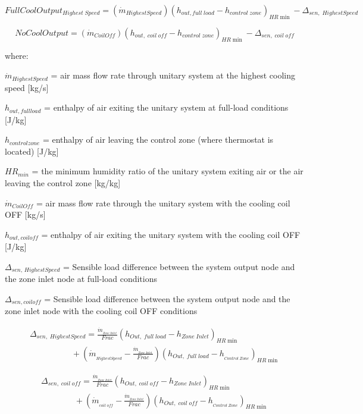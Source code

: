 \begin{equation}
  FullCoolOutpu{t_{Highest\;Speed}} = ({\dot m_{HighestSpeed}}){({h_{out,full\;load}} - {h_{control\;zone}})_{HR\min }} - {\Delta_{sen,\;HighestSpeed}}
\end{equation}

\begin{equation}
  NoCoolOutput = ({\dot m_{CoilOff}}){({h_{out,\;coil\;off}} - {h_{control\;zone}})_{HR\min }} - {\Delta_{sen,\;coil\;off}}
\end{equation}

where:

\({\dot m_{HighestSpeed}}\) = air mass flow rate through unitary system at the highest cooling speed {[}kg/s{]}

\(h_{out,full load}\) = enthalpy of air exiting the unitary system at full-load conditions {[}J/kg{]}

\(h_{control zone}\) = enthalpy of air leaving the control zone (where thermostat is located) {[}J/kg{]}

\(HR_{min}\) = the minimum humidity ratio of the unitary system exiting air or the air leaving the control zone {[}kg/kg{]}

\({\dot m_{CoilOff}}\) = air mass flow rate through the unitary system with the cooling coil OFF {[}kg/s{]}

\(h_{out,coil off}\) = enthalpy of air exiting the unitary system with the cooling coil OFF {[}J/kg{]}

\(\Delta_{sen,\,HighestSpeed}\) = Sensible load difference between the system output node and the zone inlet node at full-load conditions

\(\Delta_{sen,coil off}\) = Sensible load difference between the system output node and the zone inlet node with the cooling coil OFF conditions

\begin{equation}
\begin{array}{l}
{\Delta_{sen,\;HighestSpeed}} = \frac{{{{\dot m}_{_{Zone\;Inlet}}}}}{{Frac}}{\left( {{h_{Out,\;full\;load}} - {h_{Zone\;Inlet}}} \right)_{HR\min }}\\\quad \quad \quad \quad \quad  + \left( {{{\dot m}_{_{HighestSpeed}}} - \frac{{{{\dot m}_{_{Zone\;Inlet}}}}}{{Frac}}} \right){\left( {{h_{Out,\;full\;load}} - {h_{_{Control\;Zone}}}} \right)_{HR\min }}
\end{array}
\end{equation}

\begin{equation}
\begin{array}{l}
{\Delta_{sen,\;coil\;off}} = \frac{{{{\dot m}_{_{Zone\;Inlet}}}}}{{Frac}}{\left( {{h_{Out,\;coil\;off}} - {h_{Zone\;Inlet}}} \right)_{HR\min }}\\\quad \quad \quad \quad  + \left( {{{\dot m}_{_{coil\;off}}} - \frac{{{{\dot m}_{_{Zone\;Inlet}}}}}{{Frac}}} \right){\left( {{h_{Out,\;coil\;off}} - {h_{_{Control\;Zone}}}} \right)_{HR\min }}
\end{array}
\end{equation}

